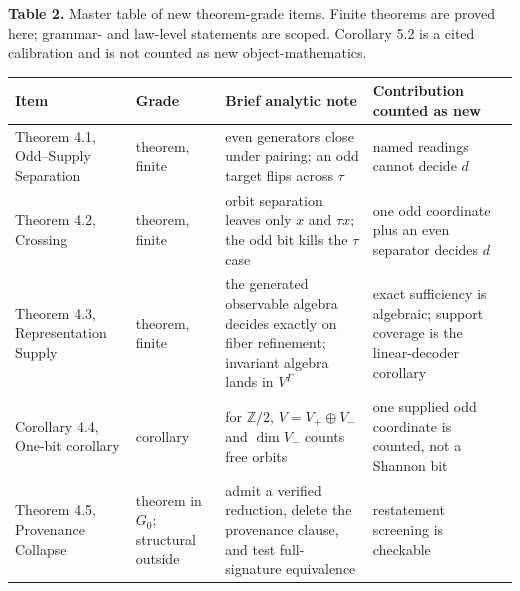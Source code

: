 \documentclass[10pt,twocolumn]{article}
\begin{document}
\textbf{Table 2.} Master table of new theorem-grade items. Finite
theorems are proved here; grammar- and law-level statements are scoped.
Corollary 5.2 is a cited calibration and is not counted as new
object-mathematics.

\begin{table}[!tbp]
\smaller
\centering
\begin{tabular}{@{}
  >{\raggedright\arraybackslash}p{}
  >{\raggedright\arraybackslash}p{}
  >{\raggedright\arraybackslash}p{}
  >{\raggedright\arraybackslash}p{}@{}}

\toprule\noalign{}
\begin{minipage}[b]{\linewidth}\raggedright
Item
\end{minipage} & \begin{minipage}[b]{\linewidth}\raggedright
Grade
\end{minipage} & \begin{minipage}[b]{\linewidth}\raggedright
Brief analytic note
\end{minipage} & \begin{minipage}[b]{\linewidth}\raggedright
Contribution counted as new
\end{minipage} \\
\midrule\noalign{}
\bottomrule\noalign{}
Theorem 4.1, Odd--Supply Separation & theorem, finite & even generators
close under pairing; an odd target flips across \(\tau\) & named
readings cannot decide \(d\) \\
Theorem 4.2, Crossing & theorem, finite & orbit separation leaves only
\(x\) and \(\tau x\); the odd bit kills the \(\tau\) case & one odd
coordinate plus an even separator decides \(d\) \\
Theorem 4.3, Representation Supply & theorem, finite & the generated
observable algebra decides exactly on fiber refinement; invariant
algebra lands in \(V^\Gamma\) & exact sufficiency is algebraic; support
coverage is the linear-decoder corollary \\
Corollary 4.4, One-bit corollary & corollary & for \(\mathbb{Z}/2\),
\(V = V_+ \oplus V_-\) and \(\dim V_-\) counts free orbits & one
supplied odd coordinate is counted, not a Shannon bit \\
Theorem 4.5, Provenance Collapse & theorem in \(G_0\); structural
outside & admit a verified reduction, delete the provenance clause, and
test full-signature equivalence & restatement screening is checkable

\end{tabular}
\end{table}
\end{document}
